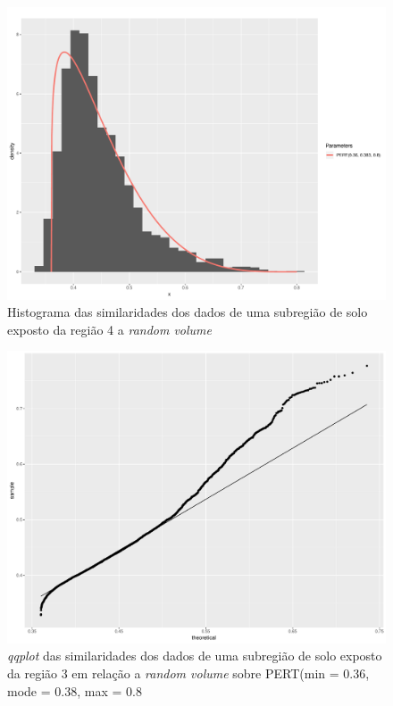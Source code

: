 \documentclass[12pt]{article}
\begin{document}
\begin{figure}[!h]

  \vspace{0.05\linewidth}

  \centering
  \includegraphics[width=0.8\linewidth]{../../Figures/Report_19_02_27/hist_rv_subregion4.pdf}
  \caption{Histograma das similaridades dos dados de uma subregião de solo exposto da região 4 a \textit{random volume}}
  \label{fig:hist_sub_rv4.1}

\end{figure}

\begin{figure}[!h]

  \vspace{0.1\linewidth}

  \centering
  \includegraphics[width=0.8\linewidth]{../../Figures/Report_19_02_27/qqplot_region3.pdf}
  \caption{\textit{qqplot} das similaridades dos dados de uma subregião de solo exposto da região 3 em relação a \textit{random volume} sobre PERT(min = 0.36, mode = 0.38, max = 0.8}
  \label{fig:qqplot_sub_rv3}

\end{figure}
\end{document}
